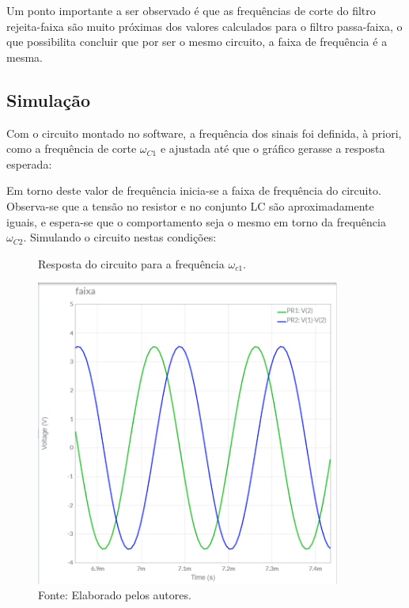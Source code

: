 Um ponto importante a ser observado é que as frequências de corte do filtro rejeita-faixa são muito próximas dos valores calculados para o filtro passa-faixa, o que possibilita concluir que por ser o mesmo circuito, a faixa de frequência é a mesma.

\subsection{Simulação}

Com o circuito montado no software, a frequência dos sinais foi definida, à priori, como a frequência de corte $\omega_{C1}$ e ajustada até que o gráfico gerasse a resposta esperada:

Em torno deste valor de frequência inicia-se a faixa de frequência do circuito. Observa-se que a tensão no resistor e no conjunto LC são aproximadamente iguais, e espera-se que o comportamento seja o mesmo em torno da frequência $\omega_{C2}$. Simulando o circuito nestas condições:

\begin{figure}[H]
	\centering
	\caption{Resposta do circuito para a frequência $\omega_{c1}$.}
	\includegraphics[width=10cm]{images/f_c1.png}
	\caption*{Fonte: Elaborado pelos autores.}
	\label{c1}
\end{figure}


